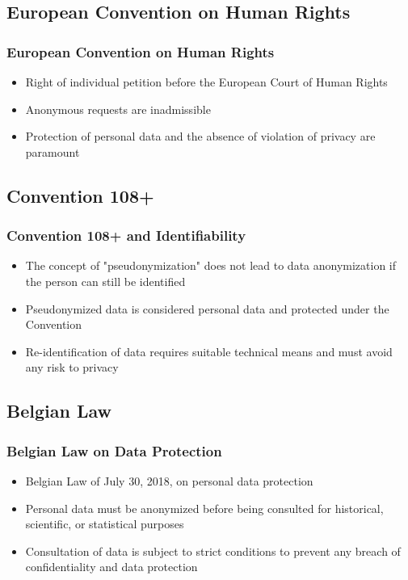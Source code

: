 \documentclass[
	11pt, %
]{beamer}
\begin{document}
\begin{frame}
  \section{European Convention on Human Rights}
  \frametitle{European Convention on Human Rights}
  \begin{itemize}
    \item Right of individual petition before the European Court of Human Rights \pause
    \item Anonymous requests are inadmissible \pause
    \item Protection of personal data and the absence of violation of privacy are paramount 
  \end{itemize}
\end{frame}

\begin{frame}
  \section{Convention 108+}
  \frametitle{Convention 108+ and Identifiability}
  \begin{itemize}
    \item The concept of "pseudonymization" does not lead to data anonymization if the person can still be identified \pause
    \item Pseudonymized data is considered personal data and protected under the Convention \pause
    \item Re-identification of data requires suitable technical means and must avoid any risk to privacy 
  \end{itemize}
\end{frame}

\begin{frame}
  \section{Belgian Law}
  \frametitle{Belgian Law on Data Protection}
  \begin{itemize}
    \item Belgian Law of July 30, 2018, on personal data protection \pause
    \item Personal data must be anonymized before being consulted for historical, scientific, or statistical purposes \pause
    \item Consultation of data is subject to strict conditions to prevent any breach of confidentiality and data protection 
  \end{itemize}
\end{frame}
\end{document}
